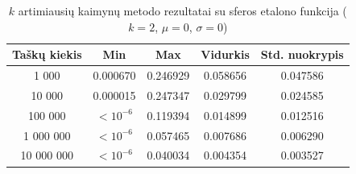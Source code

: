 \begin{table}[H]
    \centering
    \begin{tabular}{|c|c|c|c|c|}
        \hline
        \textbf{Taškų kiekis} & \textbf{Min} & \textbf{Max} & \textbf{Vidurkis} & \textbf{Std. nuokrypis} \\ \hline
        1 000        & 0.000670 & 0.246929 & 0.058656 & 0.047586 \\ \hline
        10 000       & 0.000015 & 0.247347 & 0.029799 & 0.024585 \\ \hline
        100 000      & $<10^{-6}$ & 0.119394 & 0.014899 & 0.012516 \\ \hline
        1 000 000    & $<10^{-6}$ & 0.057465 & 0.007686 & 0.006290 \\ \hline
        10 000 000   & $<10^{-6}$ & 0.040034 & 0.004354 & 0.003527 \\ \hline
    \end{tabular}
    \caption{$k$ artimiausių kaimynų metodo rezultatai su sferos etalono funkcija ($k = 2$, $\mu = 0$, $\sigma = 0$)}
\end{table}